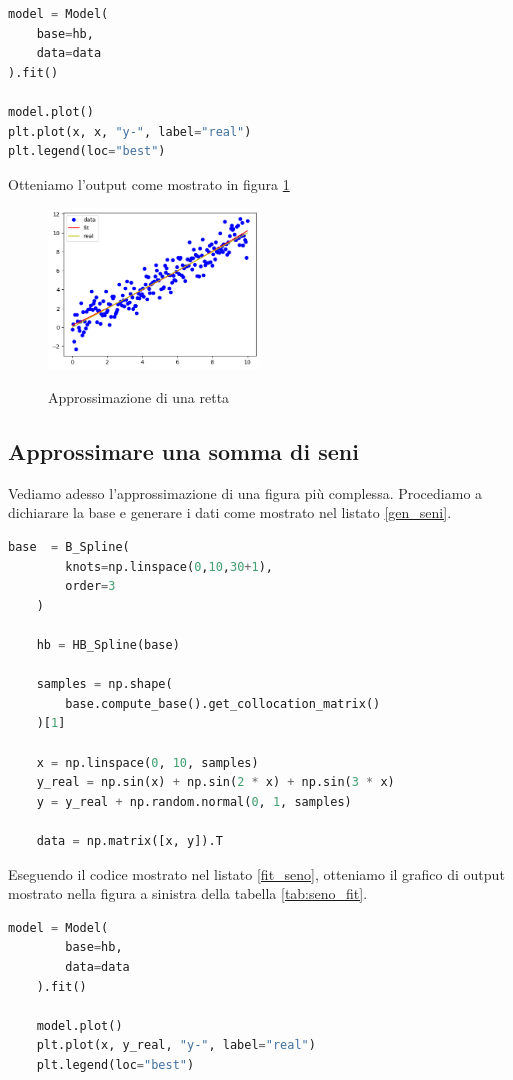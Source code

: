 \documentclass[../main.tex]{subfiles}
\begin{document}
\begin{lstlisting}[language=Python,caption={Plot dei risultati}]
model = Model(
    base=hb,
    data=data
).fit()

model.plot()
plt.plot(x, x, "y-", label="real")
plt.legend(loc="best")
\end{lstlisting}
Otteniamo l'output come mostrato in figura \ref{fig:retta_fit}
\begin{figure}[ht]
    \caption{Approssimazione di una retta}
    \includegraphics[width=0.5\textwidth]{Immagini/esempi/retta.png}
    \centering
    \label{fig:retta_fit}
\end{figure}
\subsection{Approssimare una somma di seni}
Vediamo adesso l'approssimazione di una figura più complessa.
Procediamo a dichiarare la base e generare i dati come mostrato nel listato \ref{gen_seni}.

\begin{lstlisting}[language=Python, caption={Generazione somma di seni},label=gen_seni]
    base  = B_Spline(
        knots=np.linspace(0,10,30+1),
        order=3
    )
    
    hb = HB_Spline(base)
        
    samples = np.shape(
        base.compute_base().get_collocation_matrix()
    )[1]
    
    x = np.linspace(0, 10, samples)
    y_real = np.sin(x) + np.sin(2 * x) + np.sin(3 * x)
    y = y_real + np.random.normal(0, 1, samples)
    
    data = np.matrix([x, y]).T
\end{lstlisting}
Eseguendo il codice mostrato nel listato \ref{fit_seno}, otteniamo il grafico di output mostrato nella figura a sinistra 
della tabella \ref{tab:seno_fit}.
\begin{lstlisting}[language=Python, caption={Fit somma di seni},label=fit_seno]
    model = Model(
        base=hb,
        data=data
    ).fit()
    
    model.plot()
    plt.plot(x, y_real, "y-", label="real")
    plt.legend(loc="best")
\end{lstlisting}
\end{document}
